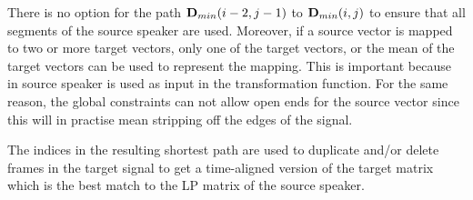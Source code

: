 \begin{remark}
There is no option for the path $\mathbf{D}_{min}(i-2,j-1)$ to $\mathbf{D}_{min}(i,j)$ to ensure that all segments of the source speaker are used. Moreover, if a source vector is mapped to two or more target vectors, only one of the target vectors, or the mean of the target vectors can be used to represent the mapping. This is important because in source speaker is used as input in the transformation function. For the same reason, the global constraints can not allow open ends for the source vector since this will in practise mean stripping off the edges of the signal.
\end{remark}

The indices in the resulting shortest path are used to duplicate and/or delete frames in the target signal to get a time-aligned version of the target matrix which is the best match to the LP matrix of the source speaker.



